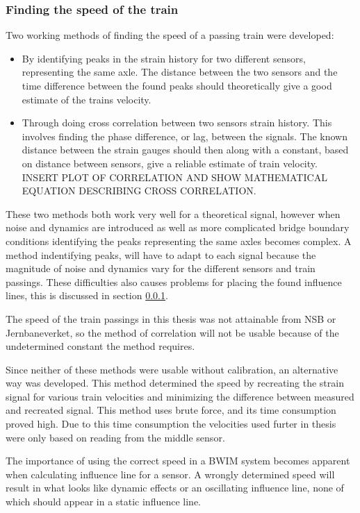 \subsubsection{Finding the speed of the train}
Two working methods of finding the speed of a passing train were developed:
\begin{itemize}
 \item By identifying peaks in the strain history for two different sensors, representing the same axle. The distance between the two sensors and the time difference between the found peaks should theoretically give a good estimate of the trains velocity.
 \item Through doing cross correlation between two sensors strain history. This involves finding the phase difference, or lag, between the signals. The known distance between the strain gauges should then along with a constant, based on distance between sensors, give a reliable estimate of train velocity. INSERT PLOT OF CORRELATION AND SHOW MATHEMATICAL EQUATION DESCRIBING CROSS CORRELATION.
\end{itemize}
These two methods both work very well for a theoretical signal, however when noise and dynamics are introduced as well as more complicated bridge boundary conditions identifying the peaks representing the same axles becomes complex. A method indentifying peaks, will have to adapt to each signal because the magnitude of noise and dynamics vary for the different sensors and train passings. These difficulties also causes problems for placing the found influence lines, this is discussed in section \ref{}.

The speed of the train passings in this thesis was not attainable from NSB or Jernbaneverket, so the method of correlation will not be usable because of the undetermined constant the method requires.

Since neither of these methods were usable without calibration, an alternative way was developed. This method determined the speed by recreating the strain signal for various train velocities and minimizing the difference between measured and recreated signal. This method uses brute force, and its time consumption proved high. Due to this time consumption the velocities used furter in thesis were only based on reading from the middle sensor.

The importance of using the correct speed in a BWIM system becomes apparent when calculating influence line for a sensor. A wrongly determined speed will result in what looks like dynamic effects or an oscillating influence line, none of which should appear in a static influence line.


